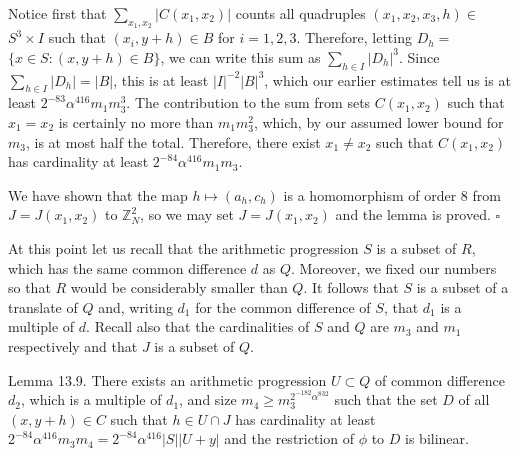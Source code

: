 \documentclass[10pt]{article}
\begin{document}
Notice first that $\sum_{x_{1}, x_{2}}\left|C\left(x_{1}, x_{2}\right)\right|$ counts all quadruples $\left(x_{1}, x_{2}, x_{3}, h\right) \in$ $S^{3} \times I$ such that $\left(x_{i}, y+h\right) \in B$ for $i=1,2,3$. Therefore, letting $D_{h}=$ $\{x \in S:(x, y+h) \in B\}$, we can write this sum as $\sum_{h \in I}\left|D_{h}\right|^{3}$. Since $\sum_{h \in I}\left|D_{h}\right|=|B|$, this is at least $|I|^{-2}|B|^{3}$, which our earlier estimates tell us is at least $2^{-83} \alpha^{416} m_{1} m_{3}^{3}$. The contribution to the sum from sets $C\left(x_{1}, x_{2}\right)$ such that $x_{1}=x_{2}$ is certainly no more than $m_{1} m_{3}^{2}$, which, by our assumed lower bound for $m_{3}$, is at most half the total. Therefore, there exist $x_{1} \neq x_{2}$ such that $C\left(x_{1}, x_{2}\right)$ has cardinality at least $2^{-84} \alpha^{416} m_{1} m_{3}$.

We have shown that the map $h \mapsto\left(a_{h}, c_{h}\right)$ is a homomorphism of order 8 from $J=J\left(x_{1}, x_{2}\right)$ to $\mathbb{Z}_{N}^{2}$, so we may set $J=J\left(x_{1}, x_{2}\right)$ and the lemma is proved. \(\square\)

At this point let us recall that the arithmetic progression $S$ is a subset of $R$, which has the same common difference $d$ as $Q$. Moreover, we fixed our numbers so that $R$ would be considerably smaller than $Q$. It follows that $S$ is a subset of a translate of $Q$ and, writing $d_{1}$ for the common difference of $S$, that $d_{1}$ is a multiple of $d$. Recall also that the cardinalities of $S$ and $Q$ are $m_{3}$ and $m_{1}$ respectively and that $J$ is a subset of $Q$.

Lemma 13.9. There exists an arithmetic progression $U \subset Q$ of common difference $d_{2}$, which is a multiple of $d_{1}$, and size $m_{4} \geqslant m_{3}^{2^{-182}\alpha^{832}}$ such that the set $D$ of all $(x, y+h) \in C$ such that $h \in U \cap J$ has cardinality at least $2^{-84} \alpha^{416} m_{3} m_{4}=2^{-84} \alpha^{416}|S||U+y|$ and the restriction of $\phi$ to $D$ is bilinear.
\end{document}
